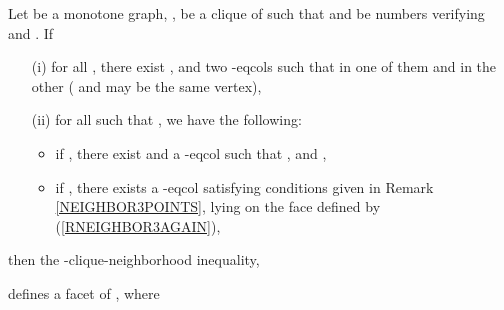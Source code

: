 \begin{tthm} \label{TNEIGHBOR3}
Let  be a monotone graph, ,  be a clique of  such that  and 
be numbers verifying  and
. If
\begin{enumerate}
\item[(i)] for all , there exist
,  and two -eqcols such that in one of them
 and in the other  ( and  may be the same vertex),
\item[(ii)] for all  such that , we have the following:
\begin{itemize}
\item if , there exist  and
a -eqcol such that ,  and ,
\item if , there exists a -eqcol
satisfying conditions given in Remark \ref{NEIGHBOR3POINTS}, \ie lying on the face defined by (\ref{RNEIGHBOR3AGAIN}),
\end{itemize} \end{enumerate}
then the -clique-neighborhood inequality, \ie

defines a facet of , where

\end{tthm}
